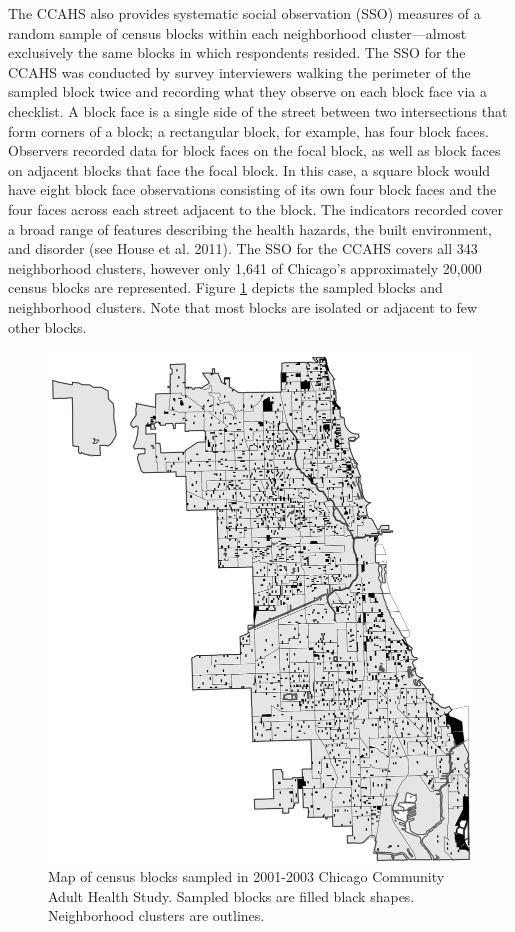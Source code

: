 \documentclass [11pt, proquest] {uwthesis}[2015/03/03]
\begin{document}
The CCAHS also provides systematic social observation (SSO) measures of a random sample of census blocks within each neighborhood cluster---almost exclusively the same blocks in which respondents resided. The SSO for the CCAHS was conducted by survey interviewers walking the perimeter of the sampled block twice and recording what they observe on each block face via a checklist. A block face is a single side of the street between two intersections that form corners of a block; a rectangular block, for example, has four block faces. Observers recorded data for block faces on the focal block, as well as block faces on adjacent blocks that face the focal block. In this case, a square block would have eight block face observations consisting of its own four block faces and the four faces across each street adjacent to the block. The indicators recorded cover a broad range of features describing the health hazards, the built environment, and disorder (see House et al. 2011). The SSO for the CCAHS covers all 343 neighborhood clusters, however only 1,641 of Chicago's approximately 20,000 census blocks are represented. Figure \ref{fig:blocksample} depicts the sampled blocks and neighborhood clusters. Note that most blocks are isolated or adjacent to few other blocks.\linebreak
\linebreak
\begin{figure}

{\centering \includegraphics[width=0.93\linewidth]{./figure/ch2/boundary_map} 

}

\caption[Map of census blocks sampled in 2001-2003 Chicago Community Adult Health Study.]{Map of census blocks sampled in 2001-2003 Chicago Community Adult Health Study. Sampled blocks are filled black shapes. Neighborhood clusters are outlines. }\label{fig:blocksample}
\end{figure}
\end{document}
